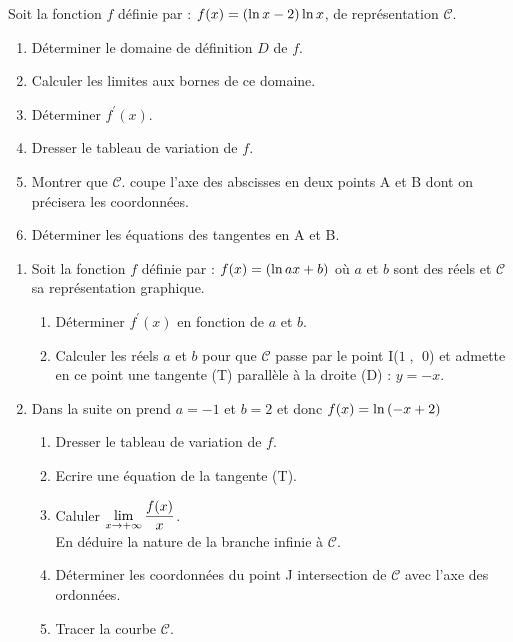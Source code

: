    \begin{exercice}


 Soit la fonction $ f $ définie par : $ f(x)=\left(\ln x-2\right) \ln x $, de  représentation $ \mathscr{C} $.
 \begin{enumerate}
 \item Déterminer le domaine de définition $ D $   de $ f. $
 \item Calculer les limites aux bornes de  ce domaine.
 \item Déterminer $ f^{\prime}(x)$.
  \item Dresser le tableau de variation de $ f. $
  \item Montrer que $ \mathscr{C} $.  coupe l'axe des abscisses en deux points A et B dont on précisera les coordonnées.
  \item Déterminer les équations des tangentes en A et B.
 \end{enumerate}
  \end{exercice}
  
  \begin{exercice}

 \begin{enumerate}
 \item 
 Soit la fonction $ f $ définie par : $ f(x)=\left(\ln ax+b\right) $  où $ a$ et $b $  sont des réels  et  $ \mathscr{C} $ sa  représentation graphique.
 \begin{enumerate}
 \item Déterminer  $ f^{\prime}(x) $ en fonction de $ a$ et $b $.
 \item Calculer les réels $ a$ et $b $  pour que $ \mathscr{C} $  passe par le point I($1\;$, $\;0$) et admette en ce point une tangente  (T) parallèle à la droite (D) : $ y=-x. $
 \end{enumerate}
 \item
  Dans la suite on prend $a=-1 $ et $ b=2$ et  donc $ f(x)=\ln \left(-x+2\right) $ 
 \begin{enumerate}
  \item Dresser le tableau de variation de $ f. $
  \item Ecrire une équation de la tangente (T).
  \item Caluler $ \displaystyle \lim_{x\to +\infty}\dfrac{f(x)}{x} $.\\
  
   En déduire la nature de la branche infinie à $ \mathscr{C} $.
   \item Déterminer les coordonnées du point J intersection de $ \mathscr{C} $  avec l'axe des ordonnées.
  \item Tracer la courbe $ \mathscr{C} $.
  \end{enumerate}
 \end{enumerate}
  \end{exercice}
  

